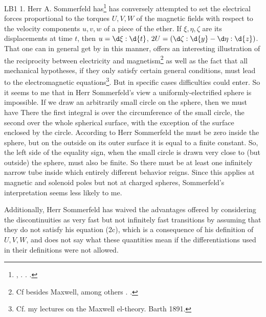 \begin{paper}{LB1}
1. Herr A. Sommerfeld has\footnote{\citeauthor{Sommerfeld},  . . \citeyear{1892}.} has conversely attempted to set the electrical forces proportional to the torques $U,V,W$ of the magnetic fields with respect to the velocity components $u,v,w$ of a piece of the ether. If $\xi, \eta, \zeta$ are its displacements at time $t$, then $u=\d\xi:\d{t}$, $2U = (\d\zeta:\d{y} - \d\eta:\d{z})$. That one can in general get by in this manner, offers an interesting illustration of the reciprocity between electricity and magnetism\footnote{Cf besides Maxwell, among others \citeauthor{Rowland}  \citeyear{1879}.  \citeyear{1880}.} as well as the fact that all mechanical hypotheses, if they only satisfy certain general conditions, must lead to the electromagnetic equations\footnote{Cf. my lectures on the Maxwell el-theory. Barth 1891.}. But in specific cases difficulties could enter. So it seems to me that in Herr Sommerfeld's view a uniformly-electrified sphere is impossible. If we draw an arbitrarily small circle on the sphere, then we must have
There the first integral is over the circumference of the small circle, the second over the whole spherical surface, with the exception of the surface enclosed by the circle. According to Herr Sommerfeld the  must be zero inside the sphere, but on the outside on its outer surface it is equal to a finite constant. So, the left side of the equality sign, when the small circle is drawn very close to (but outside) the sphere, must also be finite. So there must be at least one infinitely narrow tube  inside which entirely different behavior reigns. Since this applies at magnetic and solenoid poles but not at charged spheres, Sommerfeld's interpretation seems less likely to me.

Additionally, Herr Sommerfeld has waived the advantages offered by considering the discontinuities as very fast but not infinitely fast transitions by assuming that they do not satisfy his equation (2c), which is a consequence of his definition of $U,V,W$, and does not say what these quantities mean if the differentiations used in their definitions were not allowed.


\end{paper}
